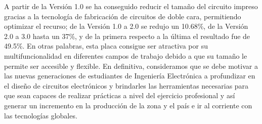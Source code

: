 \documentclass[times, 10pt,twocolumn]{article}
\begin{document}
A partir de la Versión 1.0 se ha conseguido reducir el tamaño del circuito impreso gracias a la tecnología de fabricación de circuitos de doble cara, permitiendo optimizar el recurso; de la Versión 1.0 a 2.0 se redujo un 10.68\%, de la Versión 2.0 a 3.0 hasta un 37\%, y de la primera respecto a la última el resultado fue de 49.5\%. En otras palabras, esta placa consigue ser atractiva por su multifuncionalidad en diferentes campos de trabajo debido a que su tamaño le permite ser accesible y flexible.
En definitiva, consideramos que se debe motivar a las nuevas generaciones de estudiantes de Ingeniería Electrónica a profundizar en el diseño de circuitos
electrónicos y brindarles las herramientas necesarias para que sean capaces de realizar prácticas a nivel del ejercicio profesional y así generar un incremento en la producción de la zona y el país e ir al corriente con las tecnologías globales.
\end{document}
